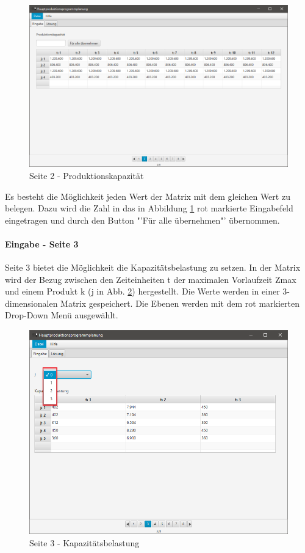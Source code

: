 \documentclass[12pt,a4paper, listof=entryprefix, bibliography=totocnumbered,toc=listofnumbered,lof=listofnumbered]{scrartcl}
\begin{document}
\begin{figure}[H]
	\centering
	\includegraphics[width=.8\linewidth]{images/seite2.png} 
	\caption{Seite 2 - Produktionskapazität}
	\label{fig:seite2}
\end{figure}

Es besteht die Möglichkeit jeden Wert der Matrix mit dem gleichen Wert zu belegen. Dazu wird die Zahl in das in Abbildung \ref{fig:seite2} rot markierte Eingabefeld eingetragen und durch den Button "'Für alle übernehmen"' übernommen.

\paragraph{Eingabe - Seite 3}
Seite 3 bietet die Möglichkeit die Kapazitätsbelastung zu setzen. In der Matrix wird der Bezug zwischen den Zeiteinheiten t der maximalen Vorlaufzeit Zmax und einem Produkt k (j in Abb. \ref{fig:seite3}) hergestellt. Die Werte werden in einer 3-dimensionalen Matrix gespeichert. Die Ebenen werden mit dem rot markierten Drop-Down Menü ausgewählt.

\begin{figure}[H]
	\centering
	\includegraphics[width=.8\linewidth]{images/seite3.png} 
	\caption{Seite 3 - Kapazitätsbelastung}
	\label{fig:seite3}
\end{figure}
\end{document}
